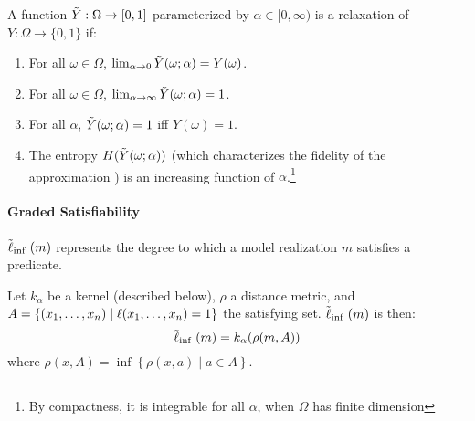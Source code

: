 

\begin{definition}
A function $\tilde{Y} : \Omega \to [0, 1]$ parameterized by $\alpha \in [0, \infty)$ is a relaxation of $Y: \Omega \to \{0, 1\}$ if:
\begin{enumerate}[label=(\roman*)]
	\label{def:temp}
	\item For all $\omega \in \Omega$, $\lim_{\alpha \to 0}\tilde{Y}(\omega; \alpha) = Y(\omega)$.
	\item For all $\omega \in \Omega$, $\lim_{\alpha \to \infty}\tilde{Y}(\omega; \alpha) = 1$.

    \item For all $\alpha$, $\tilde{Y}(\omega; \alpha) = 1$ iff $Y(\omega) = 1$.
    \item The entropy $H(\tilde{Y}(\omega; \alpha))$ (which characterizes the fidelity of the approximation ) is an increasing function of $\alpha$.\footnote
    {By compactness, it is integrable for all $\alpha$, when $\Omega$ has finite dimension}
\end{enumerate}
\end{definition}

\paragraph{Graded Satisfiability}
$\mathrel{\tilde{\operatorname{\ell}}}_{\inf}(m)$ represents the degree to which a model realization $m$ satisfies a predicate.
\begin{definition}
Let $k_\alpha$ be a kernel (described below), $\rho$ a distance metric, and $A = \{(x_1, \dots, x_n) \mid \operatorname{\ell}(x_1, \dots, x_n) = 1\}$ the satisfying set.
$\mathrel{\tilde{\operatorname{\ell}}}_{\inf}(m)$ is then:
\begin{equation}
\mathrel{\tilde{\operatorname{\ell}}}_{\inf}(m) = k_\alpha(\rho(m, A))
\end{equation}
where $\rho(x, A) = \inf \left\{\rho(x, a) \mid a \in A\right\}$.
\end{definition}

